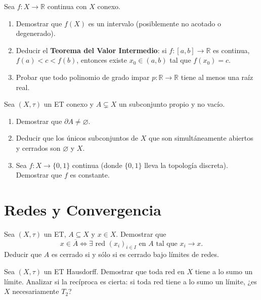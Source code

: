 \documentclass{article}
\theoremstyle{definition}
\newcommand{\R}{\mathbb{R}}
\newcommand{\cl}[1]{\overline{#1}}              %
\newcommand{\bd}{\partial}                       %
\newenvironment{ejercicio}[1]{\begin{trivlist}
\item[\hskip \labelsep {\bfseries Ejercicio}\hskip \labelsep {\bfseries #1.}]}{\end{trivlist}}
\begin{document}
\begin{ejercicio}{7}
    Sea \(f : X \to \R \) continua con \(X\) conexo.
    \begin{enumerate}
        \item Demostrar que \(f(X)\) es un intervalo (posiblemente no acotado o degenerado).
        \item Deducir el \textbf{Teorema del Valor Intermedio}: si \(f : [a, b] \to \R \) es continua, \(f(a) < c < f(b)\), entonces existe \(x_0 \in (a, b)\) tal que \(f(x_0) = c\).
        \item Probar que todo polinomio de grado impar \(p : \R \to \R \) tiene al menos una raíz real.
    \end{enumerate}
\end{ejercicio}

\begin{ejercicio}{8}
    Sea \((X, \tau)\) un ET conexo y \(A \subsetneq X\) un subconjunto propio y no vacío.
    \begin{enumerate}
        \item Demostrar que \(\bd A \neq \varnothing \).
        \item Deducir que los únicos subconjuntos de \(X\) que son simultáneamente abiertos y cerrados son \(\varnothing \) y \(X\).
        \item Sea \(f : X \to \{0, 1\} \) continua (donde \( \{0,1\} \) lleva la topología discreta). Demostrar que \(f\) es constante.
    \end{enumerate}
\end{ejercicio}

\clearpage

\section{Redes y Convergencia}

\begin{ejercicio}{9}
    Sea \((X, \tau)\) un ET, \(A \subseteq X\) y \(x \in X\). Demostrar que
    \[
        x \in \cl{A} \iff \exists \text{ red } {(x_i)}_{i \in I} \text{ en } A \text{ tal que } x_i \to x.
    \]
    Deducir que \(A\) es cerrado si y sólo si es cerrado bajo límites de redes.
\end{ejercicio}

\begin{ejercicio}{10}
    Sea \((X, \tau)\) un ET Hausdorff. Demostrar que toda red en \(X\) tiene a lo sumo un límite. Analizar si la recíproca es cierta: si toda red tiene a lo sumo un límite, ¿es \(X\) necesariamente \(T_2\)?
\end{ejercicio}
\end{document}
